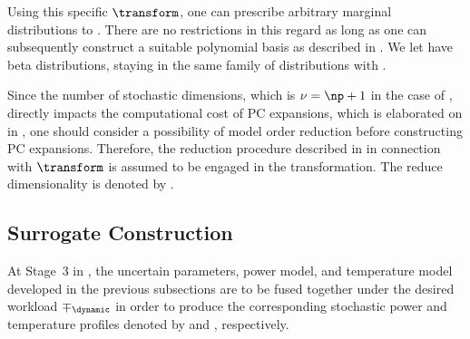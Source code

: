 Using this specific $\transform$, one can prescribe arbitrary marginal
distributions to \vz. There are no restrictions in this regard as long as one
can subsequently construct a suitable polynomial basis as described in
. We let \vz have beta distributions, staying in the
same family of distributions with \vu.

Since the number of stochastic dimensions, which is $\nu = \np + 1$ in the case
of \vu, directly impacts the computational cost of \ac{PC} expansions, which is
elaborated on in , one should consider a possibility of
model order reduction before constructing \ac{PC} expansions. Therefore, the
reduction procedure described in  in connection
with $\transform$ is assumed to be engaged in the transformation. The reduce
dimensionality is denoted by \nz.

\subsection{Surrogate Construction}

At Stage~3 in , the uncertain parameters, power model, and
temperature model developed in the previous subsections are to be fused together
under the desired workload $\mp_\dynamic$ in order to produce the corresponding
stochastic power and temperature profiles denoted by \mp and \mq, respectively.

